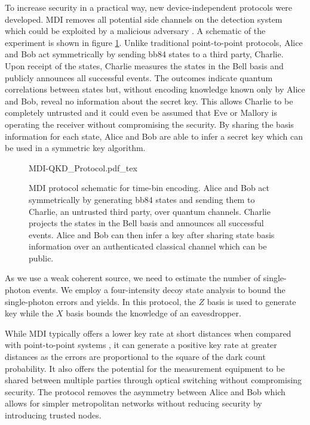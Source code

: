 To increase security in a practical way, new device-independent protocols were developed. \ac{MDI} removes all potential side channels on the detection system which could be exploited by a malicious adversary \cite{mdi-qkd}. A schematic of the experiment is shown in figure \ref{fig:mdi_protocol}. Unlike traditional point-to-point protocols, Alice and Bob act symmetrically by sending \ac{bb84} states to a third party, Charlie. Upon receipt of the states, Charlie measures the states in the Bell basis and publicly announces all successful events. The outcomes indicate quantum correlations between states but, without encoding knowledge known only by Alice and Bob, reveal no information about the secret key. This allows Charlie to be completely untrusted and it could even be assumed that Eve or Mallory is operating the receiver without compromising the security. By sharing the basis information for each state, Alice and Bob are able to infer a secret key which can be used in a symmetric key algorithm. 

\begin{figure}[tp]
	\centering
	\small
	\def\svgwidth{\textwidth} 
	{MDI-QKD_Protocol.pdf_tex}
	\caption[MDI-QKD time-bin encoded protocol]{\Ac{MDI} protocol schematic for time-bin encoding. Alice and Bob act symmetrically by generating \acs{bb84} states and sending them to Charlie, an untrusted third party, over quantum channels. Charlie projects the states in the Bell basis and announces all successful events. Alice and Bob can then infer a key after sharing state basis information over an authenticated classical channel which can be public.}
	\label{fig:mdi_protocol}
\end{figure}

As we use a weak coherent source, we need to estimate the number of single-photon events. We employ a four-intensity decoy state analysis \cite{zhou2016} to bound the single-photon errors and yields. In this protocol, the $Z$ basis is used to generate key while the $X$ basis bounds the knowledge of an eavesdropper. 

While \ac{MDI} typically offers a lower key rate at short distances when compared with point-to-point systems \cite{Sibson2017InP}, it can generate a positive key rate at greater distances \cite{yin2016} as the errors are proportional to the square of the dark count probability. It also offers the potential for the measurement equipment to be shared between multiple parties through optical switching without compromising security. The protocol removes the  asymmetry between Alice and Bob which allows for simpler metropolitan networks without reducing security by introducing trusted nodes.

